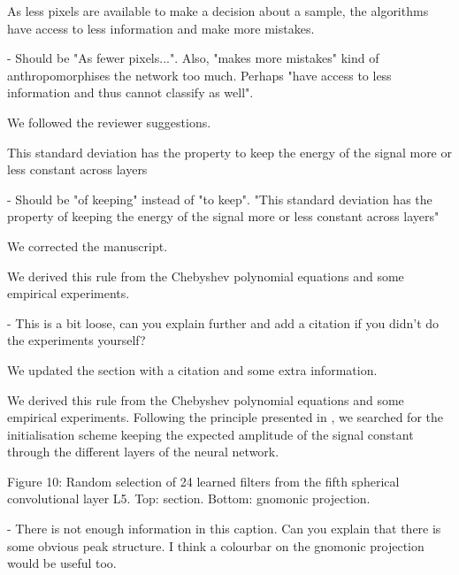 \documentclass[12pt,a4paper]{article}
\newcommand{\nati}[1]{{\color[rgb]{.1,.6,.1}{NP: #1}}}
\newcommand{\TK}[1]{{\color{red}{TK: #1}}}
\newcommand{\todo}[1]{{\color[rgb]{.6,.1,.6}{TODO: #1}}}
\newcommand{\1}{\b{1}}              %
\newcommand{\0}{\b{0}}              %
\begin{document}
\begin{mdframed}[style=comment]
As less pixels are available to make a decision about a sample, the algorithms have access to less information and make more mistakes.

- Should be "As fewer pixels...". Also, "makes more mistakes" kind of anthropomorphises the network too much. Perhaps "have access to less information and thus cannot classify as well".
\end{mdframed}
We followed the reviewer suggestions.

\begin{mdframed}[style=comment]
This standard deviation has the property to keep the energy of the signal more or less constant across layers

- Should be "of keeping" instead of "to keep". "This standard deviation has the property of keeping the energy of the signal more or less constant across layers"
\end{mdframed}
We corrected the manuscript.

\begin{mdframed}[style=comment]
We derived this rule from the Chebyshev polynomial equations and some empirical experiments.

- This is a bit loose, can you explain further and add a citation if you didn't do the experiments yourself?
\end{mdframed}
We updated the section with a citation and some extra information.
\begin{mdframed}[style=manuscript]
We derived this rule from the Chebyshev polynomial equations and some empirical experiments. Following the principle presented in \cite{glorot2010understanding}, we searched for the initialisation scheme keeping the expected amplitude of the signal constant through the different layers of the neural network.
\end{mdframed}

\begin{mdframed}[style=comment]
Figure 10: Random selection of 24 learned filters from the fifth spherical convolutional layer L5. Top: section. Bottom: gnomonic projection.

- There is not enough information in this caption. Can you explain that there is some obvious peak structure. I think a colourbar on the gnomonic projection would be useful too.
\end{mdframed}
\todo{Assign: @all}
\end{document}
